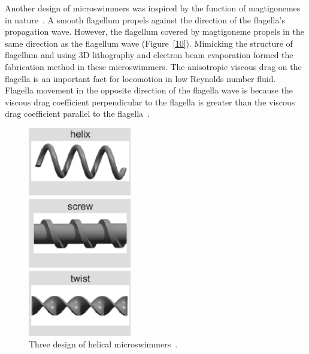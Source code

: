 \documentclass[12pt,a4paper,titlepage]{report}
\begin{document}
Another design of microswimmers was inspired by the function of magtigonemes in nature~\citep{tottori2013artificial}.
 A smooth flagellum propels against the direction of the flagella\rq{}s propagation wave. However, 
the flagellum covered by magtigoneme propels in the same direction as the flagellum wave (Figure~\ref{10}). Mimicking 
the structure of flagellum and using 3D lithography and electron beam evaporation formed the fabrication 
method in these microswimmers.
The anisotropic viscous drag on the flagella is an important fact for locomotion in low Reynolds number fluid. 
Flagella movement in the opposite direction of the flagella wave is because the 
viscous drag coefficient perpendicular to the flagella is greater than the viscous drag coefficient parallel to 
the flagella~\citep{tottori2013artificial}. 



\begin{figure}
  \begin{center}
    \includegraphics[width=0.4\textwidth]{HelixShapes}
  \caption{Three design of helical microswimmers~\citep{peyer2013magnetic}.}
  \label{HelixShapes}
  \end{center}
\end{figure}
\end{document}
